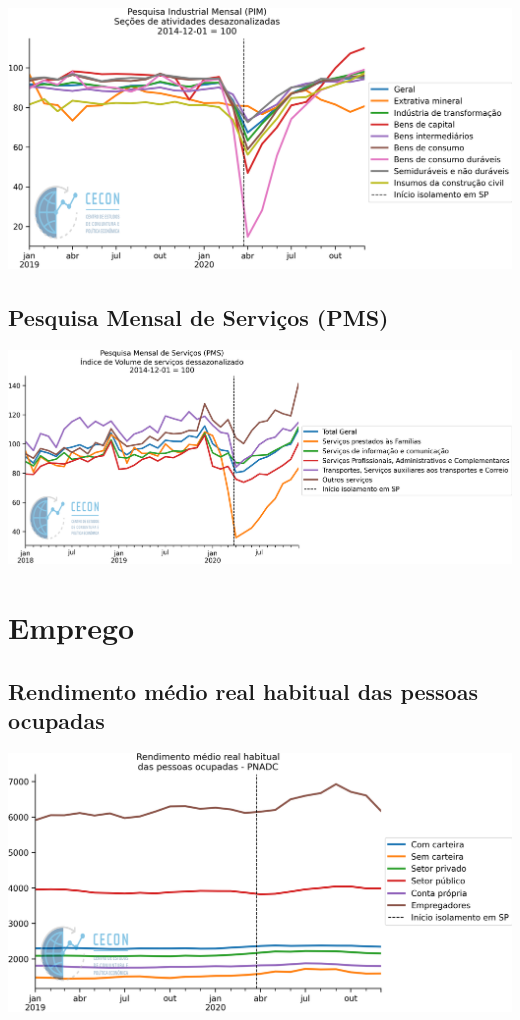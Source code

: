 \documentclass{SelfArx}
\begin{document}
\begin{center}
\includegraphics[width=.9\linewidth]{./figs/Setoriais/PIM_IBGE.png}
\end{center}


\subsection*{Pesquisa Mensal de Serviços (PMS)}
\label{sec:org2b050d2}

\begin{center}
\includegraphics[width=.9\linewidth]{./figs/Setoriais/PMS_IBGE.png}
\end{center}

\section*{Emprego}
\label{sec:org49c9d43}

\subsection*{Rendimento médio real habitual das pessoas ocupadas}
\label{sec:org7b43964}


\begin{center}
\includegraphics[width=.9\linewidth]{./figs/Emprego/RMHPO.png}
\end{center}
\end{document}
